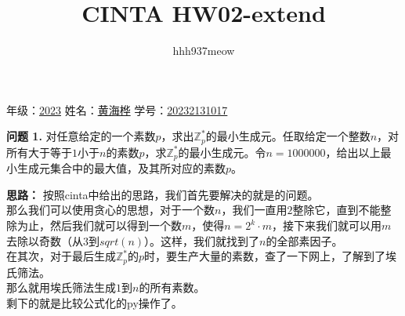 \documentclass[a4paper]{CINTA}
\title{CINTA HW02-extend}
\author{hhh937meow}
\begin{document}
\maketitle
\begin{center}
    年级：\underline{2023\hspace{1.5cm}} 
    姓名：\underline{黄海桦\hspace{1.5cm}} 
    学号：\underline{20232131017\hspace{1.5cm}} 
\end{center}

\textbf{问题 1.} 对任意给定的一个素数$p$，求出$\mathbb{Z}_p^*$的最小生成元。任取给定一个整数$n$，对所有大于等于$1$小于$n$的素数$p$，求$\mathbb{Z}_p^*$的最小生成元。令$n = 1000000$，给出以上最小生成元集合中的最大值，及其所对应的素数$p$。

\textbf{思路：}
按照cinta中给出的思路，我们首先要解决的就是的问题。\\
那么我们可以使用贪心的思想，对于一个数$n$，我们一直用$2$整除它，直到不能整除为止，然后我们就可以得到一个数$m$，使得$n = 2^k \cdot m$，接下来我们就可以用$m$去除以奇数（从$3$到$sqrt(n)$）。这样，我们就找到了$n$的全部素因子。\\

在其次，对于最后生成$\mathbb{Z}_p^*$的$p$时，要生产大量的素数，查了一下网上，了解到了埃氏筛法。\\
那么就用埃氏筛法生成$1$到$n$的所有素数。\\

剩下的就是比较公式化的py操作了。\\
\end{document}
